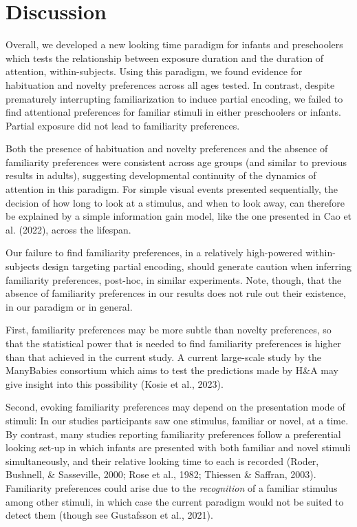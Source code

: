 \documentclass[10pt, letterpaper]{article}
\begin{document}
\hypertarget{discussion}{%
\section{Discussion}\label{discussion}}

Overall, we developed a new looking time paradigm for infants and
preschoolers which tests the relationship between exposure duration and
the duration of attention, within-subjects. Using this paradigm, we
found evidence for habituation and novelty preferences across all ages
tested. In contrast, despite prematurely interrupting familiarization to
induce partial encoding, we failed to find attentional preferences for
familiar stimuli in either preschoolers or infants. Partial exposure did
not lead to familiarity preferences.

Both the presence of habituation and novelty preferences and the absence
of familiarity preferences were consistent across age groups (and
similar to previous results in adults), suggesting developmental
continuity of the dynamics of attention in this paradigm. For simple
visual events presented sequentially, the decision of how long to look
at a stimulus, and when to look away, can therefore be explained by a
simple information gain model, like the one presented in Cao et al.
(2022), across the lifespan.

Our failure to find familiarity preferences, in a relatively
high-powered within-subjects design targeting partial encoding, should
generate caution when inferring familiarity preferences, post-hoc, in
similar experiments. Note, though, that the absence of familiarity
preferences in our results does not rule out their existence, in our
paradigm or in general.

First, familiarity preferences may be more subtle than novelty
preferences, so that the statistical power that is needed to find
familiarity preferences is higher than that achieved in the current
study. A current large-scale study by the ManyBabies consortium which
aims to test the predictions made by H\&A may give insight into this
possibility (Kosie et al., 2023).

Second, evoking familiarity preferences may depend on the presentation
mode of stimuli: In our studies participants saw one stimulus, familiar
or novel, at a time. By contrast, many studies reporting familiarity
preferences follow a preferential looking set-up in which infants are
presented with both familiar and novel stimuli simultaneously, and their
relative looking time to each is recorded (Roder, Bushnell, \&
Sasseville, 2000; Rose et al., 1982; Thiessen \& Saffran, 2003).
Familiarity preferences could arise due to the \emph{recognition} of a
familiar stimulus among other stimuli, in which case the current
paradigm would not be suited to detect them (though see Gustafsson et
al., 2021).
\end{document}
